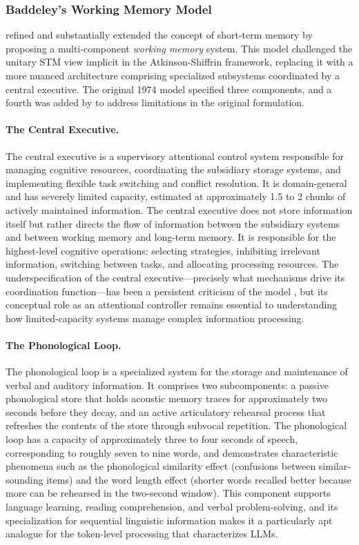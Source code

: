 \documentclass[11pt,letterpaper]{article}
\begin{document}
\subsubsection{Baddeley's Working Memory Model}

\cite{baddeley1974working} refined and substantially extended the concept of short-term memory by proposing a multi-component \emph{working memory} system. This model challenged the unitary STM view implicit in the Atkinson-Shiffrin framework, replacing it with a more nuanced architecture comprising specialized subsystems coordinated by a central executive. The original 1974 model specified three components, and a fourth was added by \cite{baddeley2000episodic} to address limitations in the original formulation.

\paragraph{The Central Executive.} The central executive is a supervisory attentional control system responsible for managing cognitive resources, coordinating the subsidiary storage systems, and implementing flexible task switching and conflict resolution. It is domain-general and has severely limited capacity, estimated at approximately 1.5 to 2 chunks of actively maintained information. The central executive does not store information itself but rather directs the flow of information between the subsidiary systems and between working memory and long-term memory. It is responsible for the highest-level cognitive operations: selecting strategies, inhibiting irrelevant information, switching between tasks, and allocating processing resources. The underspecification of the central executive---precisely what mechanisms drive its coordination function---has been a persistent criticism of the model \cite{baddeley2003working}, but its conceptual role as an attentional controller remains essential to understanding how limited-capacity systems manage complex information processing.

\paragraph{The Phonological Loop.} The phonological loop is a specialized system for the storage and maintenance of verbal and auditory information. It comprises two subcomponents: a passive phonological store that holds acoustic memory traces for approximately two seconds before they decay, and an active articulatory rehearsal process that refreshes the contents of the store through subvocal repetition. The phonological loop has a capacity of approximately three to four seconds of speech, corresponding to roughly seven to nine words, and demonstrates characteristic phenomena such as the phonological similarity effect (confusions between similar-sounding items) and the word length effect (shorter words recalled better because more can be rehearsed in the two-second window). This component supports language learning, reading comprehension, and verbal problem-solving, and its specialization for sequential linguistic information makes it a particularly apt analogue for the token-level processing that characterizes LLMs.
\end{document}
